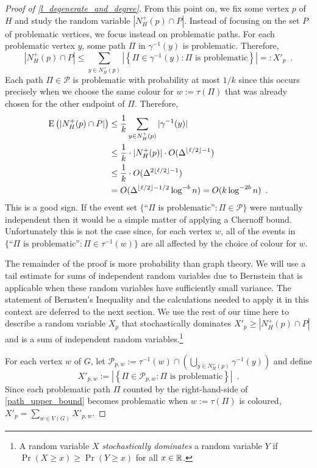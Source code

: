 \documentclass{patmorin}
\newcommand{\defin}[1]{\emph{\color{brightmaroon}#1}}
\begin{document}
\begin{proof}[Proof of \cref{l_degenerate_and_degree}]
  From this point on, we fix some vertex $p$ of $H$ and study the random variable $|N_H^+(p)\cap P|$.  Instead of focusing on the set $P$ of problematic vertices, we focus instead on problematic paths.  For each problematic vertex $y$, some path $\Pi$ in $\gamma^{-1}(y)$ is problematic. Therefore,
  \begin{equation}
    |N^+_H(p)\cap P| \le \sum_{y\in N^+_H(p)} \left|\left\{\Pi\in\gamma^{-1}(y): \text{$\Pi$ is problematic}\right\}\right| =: X'_{p} \enspace .
    \label{path_upper_bound}
  \end{equation}
  Each path $\Pi\in\mathcal{P}$ is problematic with probability at most $1/k$ since this occurs precisely when we choose the same colour for $w:=\tau(\Pi)$ that was already chosen for the other endpoint of $\Pi$.  Therefore,
  \begin{align*}
    \mathrm{E}\left(|N^+_H(p)\cap P|\right)
    & \le \frac{1}{k}\sum_{y\in N^+_H(p)}|\gamma^{-1}(y)| \\
    & \le \frac{1}{k}\cdot|N^+_H(p)|\cdot O(\Delta^{\lfloor\ell /2\rfloor-1}) \\
    & \le \frac{1}{k}\cdot O(\Delta^{2\lfloor\ell /2\rfloor-1}) \\
    & = O(\Delta^{\lfloor\ell /2\rfloor-1/2}\log^{-b} n) = O(k\log^{-2b} n) \enspace .
  \end{align*}
  This is a good sign. If the event set $\{\text{``$\Pi$ is problematic''}:\Pi\in\mathcal{P}\}$ were mutually independent then it would be a simple matter of applying a Chernoff bound.  Unfortunately this is not the case since, for each vertex $w$, all of the events in $\{\text{``$\Pi$ is problematic''}:\Pi\in\tau^{-1}(w)\}$ are all affected by the choice of colour for $w$.

  The remainder of the proof is more probability than graph theory.  We will use a tail estimate for sums of independent random variables due to Bernstein that is applicable when these random variables have sufficiently small variance.  The statement of Bernsten's Inequality and the calculations needed to apply it in this context are deferred to the next section. We use the rest of our time here to describe a random variable $X_p$ that stochastically dominates $X'_p\ge |N^+_H(p)\cap P|$ and is a sum of independent random variables.\footnote{A random variable $X$ \defin{stochastically dominates} a random variable $Y$ if $\Pr(X\ge x) \ge \Pr(Y\ge x)$ for all $x\in\mathbb{R}$.}

  For each vertex $w$ of $G$, let $\mathcal{P}_{p,w}:=\tau^{-1}(w)\cap (\bigcup_{y\in N^+_H(p)}\gamma^{-1}(y))$ and define
  \[
    X'_{p,w} :=\left|\left\{\Pi\in\mathcal{P}_{p,w}:\text{$\Pi$ is problematic}\right\}\right|
    \enspace .
  \]
  Since each problematic path $\Pi$ counted by the right-hand-side of \cref{path_upper_bound} becomes problematic when $w:=\tau(\Pi)$ is coloured, $X'_p=\sum_{w\in V(G)} X'_{p,w}$.


\end{proof}
\end{document}
